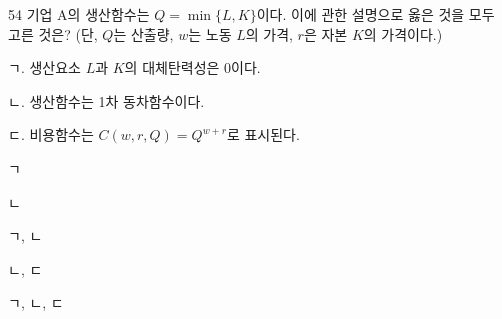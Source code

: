 \begin{question}{54}
기업 A의 생산함수는 $Q=\min\{L,K\}$이다. 이에 관한 설명으로 옳은 것을 모두 고른 것은? (단, $Q$는 산출량, $w$는 노동 $L$의 가격, $r$은 자본 $K$의 가격이다.)
\begin{framedtext}
ㄱ. 생산요소 $L$과 $K$의 대체탄력성은 0이다. \par
ㄴ. 생산함수는 1차 동차함수이다. \par
ㄷ. 비용함수는 $C(w,r,Q)=Q^{w+r}$로 표시된다. \par
\end{framedtext}
\begin{choices}
  \item ㄱ
  \item ㄴ
  \item ㄱ, ㄴ
  \item ㄴ, ㄷ
  \item ㄱ, ㄴ, ㄷ
\end{choices}
\end{question}
